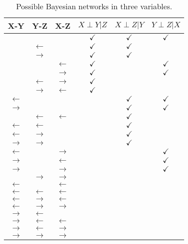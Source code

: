 \documentclass[11pt]{article}
\def\ci{\perp}
\begin{document}
\begin{enumerate}
\begin{table}[h]
\centering
\begin{tabular}{c|c|c||c|c|c}
X-Y & Y-Z  & X-Z & $X \ci Y | Z$ & $X \ci Z | Y$ & $Y \ci Z | X$ \\
\hline
 &  &  & $\checkmark$ & $\checkmark$ & $\checkmark$\\
 & $\leftarrow$ &  & $\checkmark$ & $\checkmark$ & \\
 & $\rightarrow$ &  & $\checkmark$ & $\checkmark$ & \\
 &  & $\leftarrow$ & $\checkmark$ &  & $\checkmark$\\
 &  & $\rightarrow$ & $\checkmark$ &  & $\checkmark$\\
 & $\leftarrow$ & $\rightarrow$ & $\checkmark$ &  & \\
 & $\rightarrow$ & $\leftarrow$ & $\checkmark$ &  & \\
$\leftarrow$ &  &  &  & $\checkmark$ & $\checkmark$\\
$\rightarrow$ &  &  &  & $\checkmark$ & $\checkmark$\\
 & $\leftarrow$ & $\leftarrow$ &  & $\checkmark$ & \\
$\leftarrow$ & $\leftarrow$ &  &  & $\checkmark$ & \\
$\leftarrow$ & $\rightarrow$ &  &  & $\checkmark$ & \\
$\rightarrow$ & $\rightarrow$ &  &  & $\checkmark$ & \\
$\leftarrow$ &  & $\rightarrow$ &  &  & $\checkmark$\\
$\rightarrow$ &  & $\leftarrow$ &  &  & $\checkmark$\\
$\rightarrow$ &  & $\rightarrow$ &  &  & $\checkmark$\\
 & $\rightarrow$ & $\rightarrow$ &  &  & \\
$\leftarrow$ &  & $\leftarrow$ &  &  & \\
$\leftarrow$ & $\leftarrow$ & $\leftarrow$ &  &  & \\
$\leftarrow$ & $\rightarrow$ & $\leftarrow$ &  &  & \\
$\leftarrow$ & $\rightarrow$ & $\rightarrow$ &  &  & \\
$\rightarrow$ & $\leftarrow$ &  &  &  & \\
$\rightarrow$ & $\leftarrow$ & $\leftarrow$ &  &  & \\
$\rightarrow$ & $\leftarrow$ & $\rightarrow$ &  &  & \\
$\rightarrow$ & $\rightarrow$ & $\rightarrow$ &  &  & 
\end{tabular}
\caption{Possible Bayesian networks in three variables.}
\label{fig:possible}
\end{table}


\end{enumerate}
\end{document}

